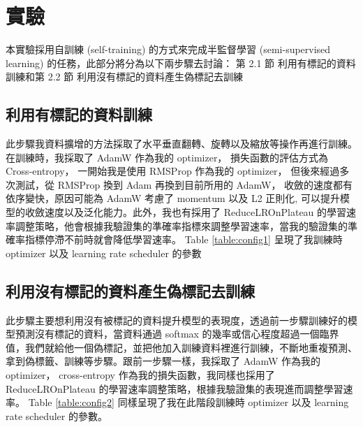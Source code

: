 \documentclass[a4paper,12pt]{article}   %
\begin{document}
\section{實驗}

本實驗採用自訓練 (self-training) 的方式來完成半監督學習 (semi-supervised learning) 的任務，此部分將分為以下兩步驟去討論： 第 2.1 節 利用有標記的資料訓練和第 2.2 節 利用沒有標記的資料產生偽標記去訓練


\subsection{利用有標記的資料訓練}
	此步驟我資料擴增的方法採取了水平垂直翻轉、旋轉以及縮放等操作再進行訓練。在訓練時，我採取了 AdamW 作為我的 optimizer， 損失函數的評估方式為 Cross-entropy， 一開始我是使用 RMSProp 作為我的 optimizer， 但後來經過多次測試，從 RMSProp 換到 Adam 再換到目前所用的 AdamW， 收斂的速度都有依序變快，原因可能為 AdamW 考慮了 momentum 以及 L2 正則化, 可以提升模型的收斂速度以及泛化能力。此外，我也有採用了 ReduceLROnPlateau 的學習速率調整策略，他會根據我驗證集的準確率指標來調整學習速率，當我的驗證集的準確率指標停滯不前時就會降低學習速率。 Table \ref{table:config1} 呈現了我訓練時 optimizer 以及 learning rate scheduler 的參數
	
	
\begin{table}[htb]
	\centering	
	\normalsize
    \newcommand{\z}{\phantom{0}}
    \caption{Configurations of optimizer and learning rate scheduler}
    \vspace{0.15\baselineskip}
	\label{table:config1}
   \vspace{0.1\baselineskip}
\end{table}
	
\subsection{利用沒有標記的資料產生偽標記去訓練}
	此步驟主要想利用沒有被標記的資料提升模型的表現度，透過前一步驟訓練好的模型預測沒有標記的資料，當資料通過 softmax 的幾率或信心程度超過一個臨界值，我們就給他一個偽標記，並把他加入訓練資料裡進行訓練，不斷地重複預測、拿到偽標籤、訓練等步驟。跟前一步驟一樣，我採取了 AdamW 作為我的 optimizer， cross-entropy 作為我的損失函數，我同樣也採用了 ReduceLROnPlateau 的學習速率調整策略，根據我驗證集的表現進而調整學習速率。 Table \ref{table:config2} 同樣呈現了我在此階段訓練時 optimizer 以及 learning rate scheduler 的參數。
	
\end{document}

